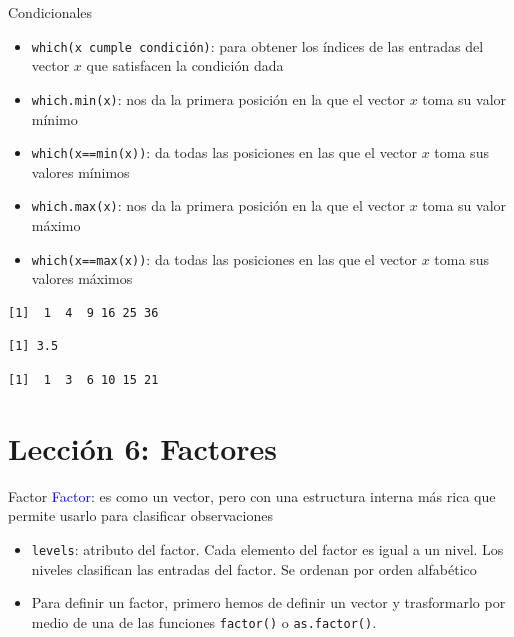 \documentclass[
  ignorenonframetext,
  aspectratio=169]{beamer}
\providecommand{\tightlist}{%
  \setlength{\itemsep}{0pt}\setlength{\parskip}{0pt}}
\newcommand\blue[1]{\textcolor{blue}{#1}}
\begin{document}
\begin{frame}[fragile]{Condicionales}
\label{condicionales}
\begin{itemize}
\tightlist
\item
  \texttt{which(x\ cumple\ condición)}: para obtener los índices de las
  entradas del vector \(x\) que satisfacen la condición dada
\item
  \texttt{which.min(x)}: nos da la primera posición en la que el vector
  \(x\) toma su valor mínimo
\item
  \texttt{which(x==min(x))}: da todas las posiciones en las que el
  vector \(x\) toma sus valores mínimos
\item
  \texttt{which.max(x)}: nos da la primera posición en la que el vector
  \(x\) toma su valor máximo
\item
  \texttt{which(x==max(x))}: da todas las posiciones en las que el
  vector \(x\) toma sus valores máximos
\end{itemize}

\begin{verbatim}
[1]  1  4  9 16 25 36
\end{verbatim}

\begin{verbatim}
[1] 3.5
\end{verbatim}

\begin{verbatim}
[1]  1  3  6 10 15 21
\end{verbatim}
\end{frame}

\section{Lección 6: Factores}\label{lecciuxf3n-6-factores}

\begin{frame}[fragile]{Factor}
\label{factor}
\blue{Factor}: es como un vector, pero con una estructura interna más
rica que permite usarlo para clasificar observaciones

\begin{itemize}
\tightlist
\item
  \texttt{levels}: atributo del factor. Cada elemento del factor es
  igual a un nivel. Los niveles clasifican las entradas del factor. Se
  ordenan por orden alfabético
\item
  Para definir un factor, primero hemos de definir un vector y
  trasformarlo por medio de una de las funciones \texttt{factor()} o
  \texttt{as.factor()}.
\end{itemize}
\end{frame}
\end{document}
